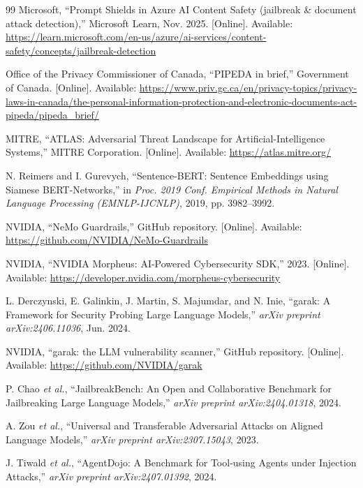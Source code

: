\documentclass[journal]{IEEEtran}
\begin{document}
\begin{thebibliography}{99}
Microsoft, ``Prompt Shields in Azure AI Content Safety (jailbreak \& document attack detection),'' Microsoft Learn, Nov. 2025. [Online]. Available: \url{https://learn.microsoft.com/en-us/azure/ai-services/content-safety/concepts/jailbreak-detection}

Office of the Privacy Commissioner of Canada, ``PIPEDA in brief,'' Government of Canada. [Online]. Available: \url{https://www.priv.gc.ca/en/privacy-topics/privacy-laws-in-canada/the-personal-information-protection-and-electronic-documents-act-pipeda/pipeda_brief/}

MITRE, ``ATLAS: Adversarial Threat Landscape for Artificial-Intelligence Systems,'' MITRE Corporation. [Online]. Available: \url{https://atlas.mitre.org/}

N. Reimers and I. Gurevych, ``Sentence-BERT: Sentence Embeddings using Siamese BERT-Networks,'' in \textit{Proc. 2019 Conf. Empirical Methods in Natural Language Processing (EMNLP-IJCNLP)}, 2019, pp. 3982--3992.

NVIDIA, ``NeMo Guardrails,'' GitHub repository. [Online]. Available: \url{https://github.com/NVIDIA/NeMo-Guardrails}

NVIDIA, ``NVIDIA Morpheus: AI-Powered Cybersecurity SDK,'' 2023. [Online]. Available: \url{https://developer.nvidia.com/morpheus-cybersecurity}

L. Derczynski, E. Galinkin, J. Martin, S. Majumdar, and N. Inie, ``garak: A Framework for Security Probing Large Language Models,'' \textit{arXiv preprint arXiv:2406.11036}, Jun. 2024.

NVIDIA, ``garak: the LLM vulnerability scanner,'' GitHub repository. [Online]. Available: \url{https://github.com/NVIDIA/garak}

P. Chao \textit{et al.}, ``JailbreakBench: An Open and Collaborative Benchmark for Jailbreaking Large Language Models,'' \textit{arXiv preprint arXiv:2404.01318}, 2024.

A. Zou \textit{et al.}, ``Universal and Transferable Adversarial Attacks on Aligned Language Models,'' \textit{arXiv preprint arXiv:2307.15043}, 2023.

J. Tiwald \textit{et al.}, ``AgentDojo: A Benchmark for Tool-using Agents under Injection Attacks,'' \textit{arXiv preprint arXiv:2407.01392}, 2024.


\end{thebibliography}
\end{document}
